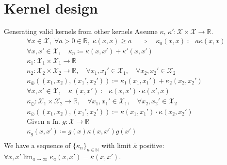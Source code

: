 \section{Kernel design}

\begin{theorem}[breakable]{Generating valid kernels from other kernels}{}
	Assume $\kappa,\,\kappa' : \mathcal{X} \times \mathcal{X} \to \mathbb{R}$.
	\begin{align*}
		\forall x \in \mathcal{X}, \; \forall a > 0 \in \mathds R, \;
		\kappa(x,x) \geq a \quad \Rightarrow \quad \kappa_a(x,x) \coloneqq a \kappa(x,x) \tag{Mult. by scalar}              \\
		\forall x,x' \in \mathcal{X}, \quad \kappa_n \coloneqq \kappa(x,x') + \kappa'(x, x') \tag{sum}\label{eq:kernel_sum} \\[1em]
		\kappa_1 : \mathcal X_1 \times \mathcal X_1 \to \mathbb R                                                           \\
		\kappa_2 : \mathcal X_2 \times \mathcal X_2 \to \mathbb R ,\quad
		\forall x_1,x_1' \in \mathcal X_1, \quad \forall x_2,x_2' \in \mathcal X_2                                          \\
		\kappa_\oplus
		\left(
		(x_1,x_2), (x_1',x_2')
		\right) \coloneqq \kappa_1(x_1,x_1') + \kappa_2(x_2,x_2') \tag{Direct sum}\label{eq:kernel_direct_sum}
		\\[1em]
		\forall x, x' \in \mathcal X, \quad
		\kappa_\cdot (x, x') \coloneqq \kappa(x,x') \cdot \kappa(x',x) \tag{Product}\label{eq:kernel_product}
		\\[1.5em]
		\kappa_\odot
		: \mathcal X_1 \times \mathcal X_2 \to \mathbb R, \quad
		\forall x_1,x_1' \in \mathcal X_1, \quad \forall x_2,x_2' \in \mathcal X_2                                          \\
		\kappa_\odot
		\left(
		(x_1,x_2), (x_1',x_2')
		\right) \coloneqq \kappa(x_1,x_1') \cdot \kappa(x_2,x_2') \tag{Tensor product}                                      \\[1.5em]
		\text{Given a fn. } g: \mathcal X \to \mathbb R                                                                     \\
		\kappa_g(x, x') \coloneqq g(x) \kappa(x, x') g(x') \tag{Composition}                                                \\[1.5em]
	\end{align*}
	We have a sequence of $\{
		\kappa_n
		\}_{n\in \mathds N}$ with limit $\bar \kappa$ positive:
	$\forall x, x' \lim_{a\to \infty} \kappa_a(x,x') = \bar \kappa(x,x')$.


\end{theorem}
